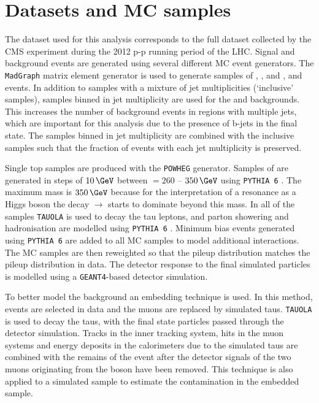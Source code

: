 \section{Datasets and \acl{MC} samples}
\label{sec:hhh_datasets}
The dataset used for this analysis corresponds to the full dataset collected by the CMS experiment during the 2012 p-p 
running period of the LHC. 
Signal and background events are generated using several different \ac{MC} event generators. The \texttt{MadGraph}
\cite{madgraph} matrix element generator is used to generate samples of \Wjets, \Zellell, \ttbar and \ZZ, \WZ and \WW
events. In addition to samples with a mixture of jet multiplicities (`inclusive' samples), samples binned in jet multiplicity
are used for the \Wjets and \Zellell backgrounds. This increases the number of background events
in regions with multiple jets, which are important for this analysis due to the presence of b-jets in the final state. 
The samples binned in jet multiplicity are combined with the
inclusive samples such that the fraction of events with each jet multiplicity is preserved.

Single top samples are produced with the \texttt{POWHEG} \cite{powheg1,powheg2} generator. Samples of \ggHtohhtobbtautau
are generated in steps of $10\,\GeV$ between \mH $= 260$ -- $350\,\GeV$ using \texttt{PYTHIA 6} \cite{pythia64}. The maximum
 mass is $350\,\GeV$ because for the interpretation of a resonance as a Higgs boson the decay \PHiggs $\rightarrow$ \ttbar
starts to dominate beyond this mass. In all of the samples
\texttt{TAUOLA} \cite{tauola} is used to decay the tau leptons, and parton showering and hadronisation are modelled using \texttt{PYTHIA 6} \cite{pythia64}.
Minimum bias events generated using \texttt{PYTHIA 6} are added to all \ac{MC} samples to model additional
interactions. The \ac{MC} samples are then reweighted so that the pileup distribution matches the
pileup distribution in data. The detector response to the final simulated particles is modelled using a \texttt{GEANT4}-based \cite{Geant4} detector simulation.

To better model the \Ztautau background an embedding technique is used. In this method, 
\Zmm events are selected in data and the muons are replaced by simulated taus. \texttt{TAUOLA} is used
to decay the taus, with the final state particles passed through the detector simulation. %
Tracks in the inner tracking system, hits in the muon systems and energy deposits in the calorimeters
due to the simulated taus are combined with the remains of the \Zmm event after the detector signals
of the two muons originating from the \PZ boson have been removed. This technique is also applied to 
a simulated \ttbar sample to estimate the \ttbar contamination in the \Zmm embedded sample. %

